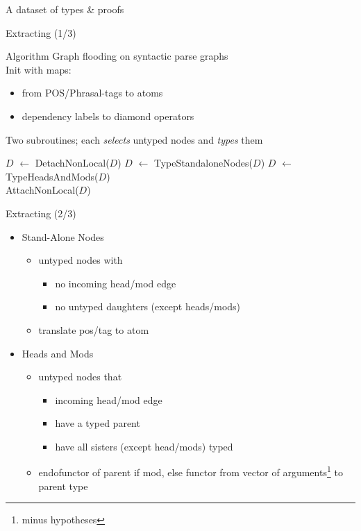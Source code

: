 \documentclass{beamer}
\begin{document}
\begin{frame}{}
	\centering
	\alert{
		A dataset of types \& proofs
	}
\end{frame}

\begin{frame}{Extracting (1/3)}
\small

	\begin{block}{Algorithm}
		Graph flooding on syntactic parse graphs \\
		Init with maps:
		\begin{itemize}
			\item[-] from POS/Phrasal-tags to atoms
			\item[-] dependency labels to diamond operators
		\end{itemize}
		Two subroutines;
			each \textit{selects} untyped nodes and \textit{types} them
	\end{block}
	
	\pause	
	\vfill
	\begin{algorithmic}
		\State $D$ $\gets$ DetachNonLocal($D$)
			\State $D$ $\gets$ TypeStandaloneNodes($D$)
			\State $D$ $\gets$ TypeHeadsAndMods($D$)
		\EndWhile\\
		\Return AttachNonLocal($D$)
	\EndFunction
	\end{algorithmic}
\end{frame}

\begin{frame}{Extracting (2/3)}
\small

	\begin{itemize}
		\item[$\lambda$1] Stand-Alone Nodes
			\begin{itemize}
				\setlength{\itemindent}{.25in}
				\item[select] untyped nodes with
					\begin{itemize}
						\item[1] no incoming head/mod edge
						\item[2] no untyped daughters (except heads/mods)
					\end{itemize}
				\item[type] translate pos/tag to atom
			\end{itemize}\vfill
		\item[$\lambda$2] Heads and Mods
			\begin{itemize}
				\setlength{\itemindent}{.25in}
				\item[select] untyped nodes that
					\begin{itemize}
						\item[1] incoming head/mod edge
						\item[2] have a typed parent
						\item[3] have all sisters (except head/mods) typed
					\end{itemize}
				\item[type] endofunctor of parent if mod, else functor from vector of arguments\footnote{minus hypotheses} to parent type
			\end{itemize}
	\end{itemize}

\end{frame}
\end{document}
